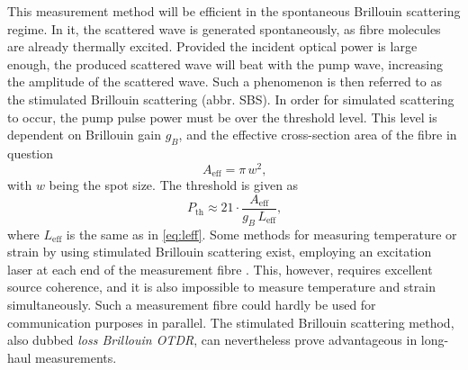 \documentclass{standalone}
\begin{document}
This measurement method will be efficient in the spontaneous Brillouin scattering regime. In it, the scattered wave is generated spontaneously, as fibre molecules are already thermally excited. Provided the incident optical power is large enough, the produced scattered wave will beat with the pump wave, increasing the amplitude of the scattered wave. Such a phenomenon is then referred to as the stimulated Brillouin scattering (abbr. SBS). In order for simulated scattering to occur, the pump pulse power must be over the threshold level. This level is dependent on Brillouin gain $g_B$, and the effective cross-section area of the fibre in question 
\begin{equation}
A_\textrm{eff} = \pi \, w^2 \textrm{,}
\end{equation}
with $w$ being the spot size. The threshold is given as
\begin{equation}
P_\textrm{th} \approx 21 \cdot \frac{A_\textrm{eff}}{g_B \, L_\textrm{eff}} \textrm{,}
\end{equation}
where $L_\textrm{eff}$ is the same as in \ref{eq:leff}. Some methods for measuring temperature or strain by using stimulated Brillouin scattering exist, employing an excitation laser at each end of the measurement fibre \cite{Rogers1999}. This, however, requires excellent source coherence, and it is also impossible to measure temperature and strain simultaneously. Such a measurement fibre could hardly be used for communication purposes in parallel. The stimulated Brillouin scattering method, also dubbed \textit{loss Brillouin OTDR}, can nevertheless prove advantageous in long-haul measurements.
\end{document}
